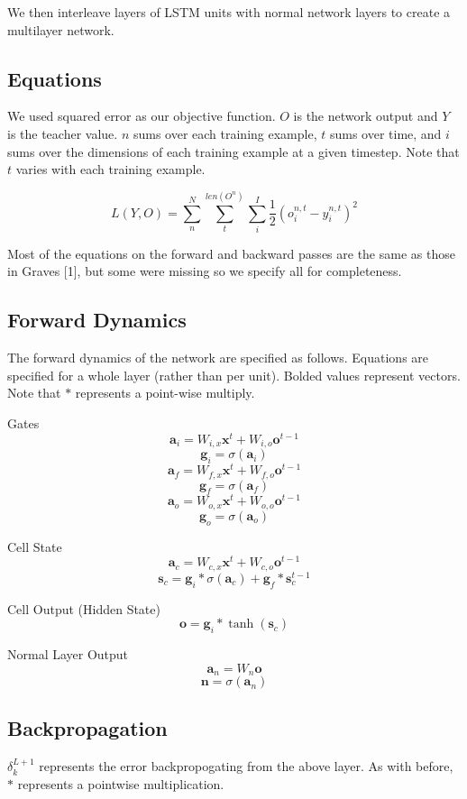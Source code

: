 \documentclass[11pt]{article}
\begin{document}
We then interleave layers of LSTM units with
normal network layers to create a multilayer network.

\subsection{Equations}

We used squared error as our objective function. \(O\) is the network
output and \(Y\) is the teacher value. \(n\) sums over each
training example, \(t\) sums over time, and \(i\) sums over the dimensions
of each training example at a given timestep.
Note that \(t\) varies with each training example.

\[  L(Y, O) = \sum_{n}^{N}  \sum_{t}^{len(O^{n})} \sum_{i}^{I} \frac{1}{2} (o_{i}^{n,t} - y_{i}^{n,t})^{2} \]

Most of the equations on the forward and backward passes are the
same as those in Graves [1], but some were missing so we specify all
for completeness.

\subsection{Forward Dynamics}
The forward dynamics of the network are specified as follows. Equations
are specified for a whole layer (rather than per unit).
 Bolded values represent vectors. Note that \(*\)
represents a point-wise multiply.

Gates
\[ \textbf{a}_{i} = W_{i,x}\textbf{x}^{t} +  W_{i,o}\textbf{o}^{t-1} \] 
\[ \textbf{g}_{i} = \sigma( \textbf{a}_{i}) \]
\[ \textbf{a}_{f} = W_{f,x}\textbf{x}^{t} +  W_{f,o}\textbf{o}^{t-1} \] 
\[ \textbf{g}_{f} = \sigma( \textbf{a}_{f}) \]
\[ \textbf{a}_{o} = W_{o,x}\textbf{x}^{t} +  W_{o,o}\textbf{o}^{t-1} \] 
\[ \textbf{g}_{o} = \sigma( \textbf{a}_{o}) \]

Cell State
\[ \textbf{a}_{c} = W_{c,x}\textbf{x}^{t} +  W_{c,o}\textbf{o}^{t-1} \] 
\[ \textbf{s}_{c} =  \textbf{g}_{i} * \sigma( \textbf{a}_{c}) + \textbf{g}_{f}*\textbf{s}_{c}^{t-1} \]

Cell Output (Hidden State)
\[ \textbf{o} =  \textbf{g}_{i} * \tanh( \textbf{s}_{c}) \]

Normal Layer Output
\[ \textbf{a}_{n} = W_{n}\textbf{o} \]
\[ \textbf{n} = \sigma( \textbf{a}_{n}) \]

\subsection{Backpropagation}
\(\delta_{k}^{L+1}\) represents the error backpropogating from the above layer. 
As with before, \(*\) represents a pointwise multiplication.
\end{document}
